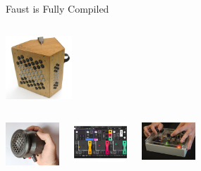 \begin{frame}[fragile]{Faust is Fully Compiled}
\begin{columns}
          \begin{center}
            \href{file:/Users/yannorlarey/Documents/demo-faust/0-Videos/3-Striso.mp4}{\includegraphics[width=2.5cm,keepaspectratio=true]{images/striso2.png}}
          \end{center}
    
        \end{columns}

      \begin{columns}

        \begin{center}
          \href{https://www.amstramgrame.fr/}{\includegraphics[width=2cm,keepaspectratio=true]{images/gramophone.jpg}}
        \end{center}


        \begin{center}
          \href{https://www.expressivee.com/61-noisy}{\includegraphics[width=2cm,keepaspectratio=true]{images/noisy.jpg}}
        \end{center}

        \begin{center}
          \href{https://www.youtube.com/watch?time_continue=6&v=acMhZe8V2ls&feature=emb_logo}{\includegraphics[width=2cm,keepaspectratio=true]{images/fpga2.png}}
        \end{center}

      \end{columns}

\end{frame}